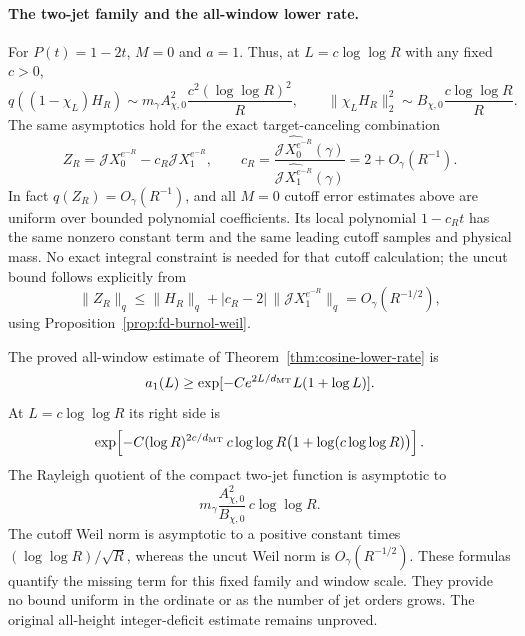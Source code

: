 \paragraph{The two-jet family and the all-window lower rate.}
For $P(t)=1-2t$, $M=0$ and $a=1$. Thus, at
$L=c\log\log R$ with any fixed $c>0$,
\[
 q((1-\chi_L)H_R)\sim
 m_\gamma A_{\chi,0}^2
             \frac{c^2(\log\log R)^2}{R},
 \qquad
 \|\chi_LH_R\|_2^2\sim
 B_{\chi,0}\frac{c\log\log R}{R}.
\]
The same asymptotics hold for the exact target-canceling
combination
\[
 Z_R=\mathcal JX_0^{e^{-R}}-c_R\mathcal JX_1^{e^{-R}},
 \qquad
 c_R=
 \frac{\widehat{\mathcal JX_0^{e^{-R}}}(\gamma)}
      {\widehat{\mathcal JX_1^{e^{-R}}}(\gamma)}
     =2+O_\gamma(R^{-1}).
\]
In fact $q(Z_R)=O_\gamma(R^{-1})$, and all $M=0$ cutoff
error estimates above are uniform over bounded polynomial
coefficients. Its local polynomial
$1-c_Rt$ has the same nonzero constant term and the same
leading cutoff samples and physical mass. No exact
integral constraint is needed for that cutoff calculation;
the uncut bound follows explicitly from
\[
 \|Z_R\|_q\le\|H_R\|_q+|c_R-2|\,
                   \|\mathcal JX_1^{e^{-R}}\|_q
                =O_\gamma(R^{-1/2}),
\]
using Proposition~\ref{prop:fd-burnol-weil}.

The proved all-window estimate of
Theorem~\ref{thm:cosine-lower-rate} is
\[
 a_1(L)\ge
 \exp[-C e^{2L/d_{\rm MT}}L(1+\log L)].
\]
At $L=c\log\log R$ its right side is
\[
 \exp\!\left[-C(\log R)^{2c/d_{\rm MT}}\,
        c\log\log R\bigl(1+\log(c\log\log R)\bigr)\right].
\]
The Rayleigh quotient of the compact two-jet
function is asymptotic to
\[
 m_\gamma\frac{A_{\chi,0}^2}{B_{\chi,0}}\,c\log\log R.
\]
The cutoff Weil norm is asymptotic to a positive constant times
$(\log\log R)/\sqrt R$, whereas the uncut Weil norm is
$O_\gamma(R^{-1/2})$.
These formulas quantify the missing term for this fixed
family and window scale. They provide no bound uniform in
the ordinate or as the number of jet orders grows.
The original all-height integer-deficit estimate remains
unproved.
